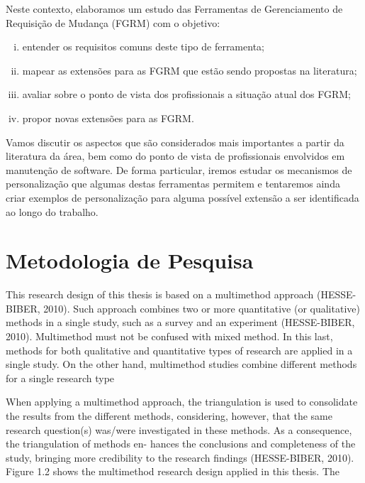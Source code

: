 Neste contexto, elaboramos um estudo das Ferramentas de Gerenciamento de Requisição de Mudança (FGRM) com o objetivo:
\begin{enumerate}[(i)]
	\item entender os requisitos comuns deste tipo de ferramenta;
	\item mapear as extensões para as FGRM que estão sendo propostas na literatura;
	\item avaliar sobre o ponto de vista dos profissionais a situação atual dos FGRM\@;
	\item propor novas extensões para as FGRM\@.  
\end{enumerate}

Vamos discutir os aspectos que são considerados mais importantes a partir da literatura da área, bem
como do ponto de vista de profissionais envolvidos em manutenção de software. De forma particular,
iremos estudar os mecanismos de personalização que algumas destas ferramentas permitem e tentaremos
ainda criar exemplos de personalização para alguma possível extensão a ser identificada ao longo do
trabalho.

\section{Metodologia de Pesquisa}
\label{sec:intro-metodologia}


This research design of this thesis is based on a multimethod approach (HESSE-BIBER,
2010). Such approach combines two or more quantitative (or qualitative) methods in a single study,
such as a survey and an experiment (HESSE-BIBER, 2010). Multimethod must not be confused with mixed
method. In this last, methods for both qualitative and quantitative types of research are applied in
a single study. On the other hand, multimethod studies combine different methods for a single
research type

When applying a multimethod approach, the triangulation is used to consolidate the
results from the different methods, considering, however, that the same research question(s)
was/were investigated in these methods. As a consequence, the triangulation of methods en- hances
the conclusions and completeness of the study, bringing more credibility to the research findings
(HESSE-BIBER, 2010). Figure 1.2 shows the multimethod research design applied in this thesis. The

